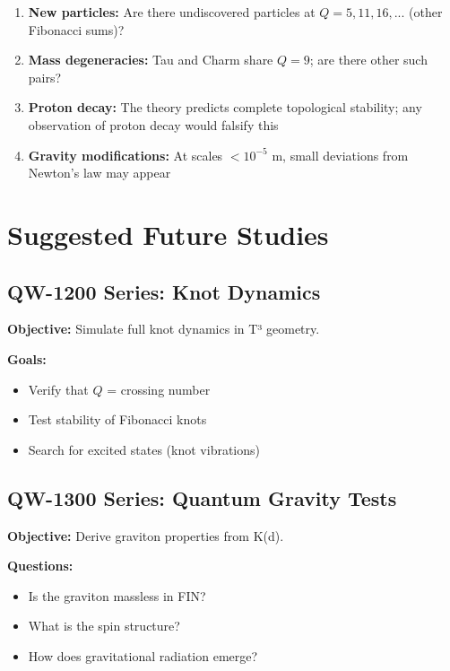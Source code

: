 \documentclass[11pt, a4paper]{article}
\theoremstyle{remark}
\begin{document}
\begin{enumerate}
    \item \textbf{New particles:} Are there undiscovered particles at $Q = 5, 11, 16, ...$ (other Fibonacci sums)?
    
    \item \textbf{Mass degeneracies:} Tau and Charm share $Q = 9$; are there other such pairs?
    
    \item \textbf{Proton decay:} The theory predicts complete topological stability; any observation of proton decay would falsify this
    
    \item \textbf{Gravity modifications:} At scales $< 10^{-5}$ m, small deviations from Newton's law may appear
\end{enumerate}

\section{Suggested Future Studies}

\subsection{QW-1200 Series: Knot Dynamics}

\textbf{Objective:} Simulate full knot dynamics in T³ geometry.

\textbf{Goals:}
\begin{itemize}
    \item Verify that $Q$ = crossing number
    \item Test stability of Fibonacci knots
    \item Search for excited states (knot vibrations)
\end{itemize}

\subsection{QW-1300 Series: Quantum Gravity Tests}

\textbf{Objective:} Derive graviton properties from K(d).

\textbf{Questions:}
\begin{itemize}
    \item Is the graviton massless in FIN?
    \item What is the spin structure?
    \item How does gravitational radiation emerge?
\end{itemize}
\end{document}
